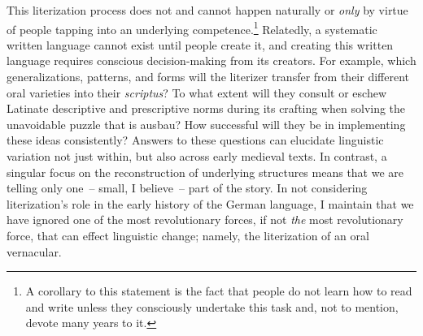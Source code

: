 This literization process does not and cannot happen naturally or \textit{only} by virtue of people tapping into an underlying competence.\footnote{\textrm{A corollary to this statement is the fact that people do not learn how to read and write unless they consciously undertake this task and, not to mention, devote many years to it.} } Relatedly, a systematic written language cannot exist until people create it, and creating this written language requires conscious decision-making from its creators. For example, which generalizations, patterns, and forms will the literizer transfer from their different oral varieties into their \textit{scriptus}? To what extent will they consult or eschew Latinate descriptive and prescriptive norms during its crafting when solving the unavoidable puzzle that is ausbau? How successful will they be in implementing these ideas consistently? Answers to these questions can elucidate linguistic variation not just within, but also across early medieval texts. In contrast, a singular focus on the reconstruction of underlying structures means that we are telling only one~-- small, I believe~-- part of the story. In not considering literization’s role in the early history of the German language, I maintain that we have ignored one of the most revolutionary forces, if not \textit{the} most revolutionary force, that can effect linguistic change; namely, the literization of an oral vernacular.

